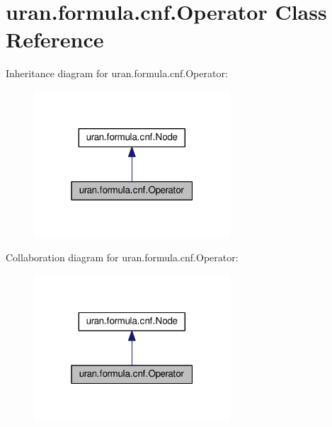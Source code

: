 \hypertarget{classuran_1_1formula_1_1cnf_1_1_operator}{}\section{uran.\+formula.\+cnf.\+Operator Class Reference}
\label{classuran_1_1formula_1_1cnf_1_1_operator}


Inheritance diagram for uran.\+formula.\+cnf.\+Operator\+:
\nopagebreak
\begin{figure}[H]
\begin{center}
\leavevmode
\includegraphics[width=208pt]{classuran_1_1formula_1_1cnf_1_1_operator__inherit__graph}
\end{center}
\end{figure}


Collaboration diagram for uran.\+formula.\+cnf.\+Operator\+:
\nopagebreak
\begin{figure}[H]
\begin{center}
\leavevmode
\includegraphics[width=208pt]{classuran_1_1formula_1_1cnf_1_1_operator__coll__graph}
\end{center}
\end{figure}
